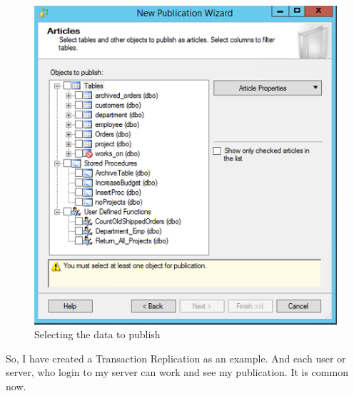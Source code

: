 \documentclass[english]{article}
\begin{document}
\begin{figure}[H]
\centerline{\includegraphics[scale=0.82]{administration/rep/13}}
\caption{Selecting the data to publish}
\end{figure}
So, I have created a Transaction Replication as an example. And each user or server, who login to my server can work and see my publication. It is common now.
\end{document}
